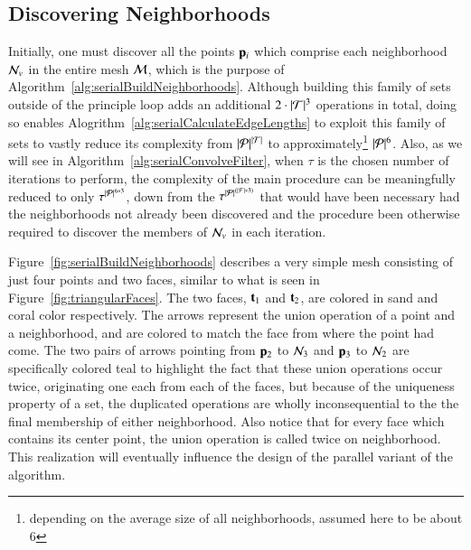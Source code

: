 \subsection{Discovering Neighborhoods}
\label{ch5sSIssDN}
Initially, one must discover all the points $\mathbf{p}_i$ which comprise each neighborhood $\mathcal{N}_v$ in the entire mesh $\mathcal{M}$, which is the purpose of Algorithm~\ref{alg:serialBuildNeighborhoods}. Although building this family of sets outside of the principle loop adds an additional $2\cdot |\mathcal{T}|^3$ operations in total, doing so enables Alogrithm~\ref{alg:serialCalculateEdgeLengths} to exploit this family of sets to vastly reduce its complexity from $|\mathcal{P}|^{|\mathcal{T}|}$ to approximately\footnote{depending on the average size of all neighborhoods, assumed here to be about 6} $|\mathcal{P}|^6$. Also, as we will see in Algorithm~\ref{alg:serialConvolveFilter}, when $\tau$ is the chosen number of iterations to perform, the complexity of the main procedure can be meaningfully reduced to only $\tau^{|\mathcal{P}|^{6*3}}$, down from the $\tau^{|\mathcal{P}|^{(|\mathcal{F}|*3)}}$ that would have been necessary had the neighborhoods not already been discovered and the procedure been otherwise required to discover the members of $\mathcal{N}_v$ in each iteration.%
%

Figure~\ref{fig:serialBuildNeighborhoods} describes a very simple mesh consisting of just four points and two faces, similar to what is seen in Figure~\ref{fig:triangularFaces}. The two faces, $\mathbf{t}_1$ and $\mathbf{t}_2$, are colored in sand and coral color respectively. The arrows represent the union operation of a point and a neighborhood, and are colored to match the face from where the point had come. The two pairs of arrows pointing from $\mathbf{p}_2$ to $\mathcal{N}_3$ and $\mathbf{p}_3$ to $\mathcal{N}_2$ are specifically colored teal to highlight the fact that these union operations occur twice, originating one each from each of the faces, but because of the uniqueness property of a set, the duplicated operations are wholly inconsequential to the the final membership of either neighborhood. Also notice that for every face which contains its center point, the union operation is called twice on neighborhood. This realization will eventually influence the design of the parallel variant of the algorithm.

